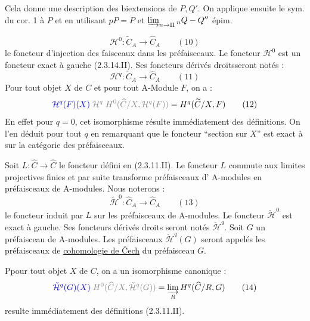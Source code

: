 Cela donne une description des biextensions de $P,Q'$. On applique ensuite le sym. du cor. 1 à $P$ et
en utilisant $pP=P$  et $\varinjlim_{n\to\Pi}{}_nQ\mathbin{-}Q''$ épim.

\[
\mathcal H^0:\widetilde C_A\longrightarrow\widehat C_A \qquad(10)
\]
le foncteur d'injection des faisceaux dans les préfaisceaux.
Le foncteur $\mathcal H^0$ est un foncteur exact à gauche (2.3.14.II).
Ses foncteurs dérivés droitsseront notés :
\[
\mathcal H^q:\widetilde C_A\longrightarrow\widehat C_A \qquad(11)
\]
Pour tout objet $X$ de $C$  et pour tout A-Module $F$, on a :
\[
\inserted{\mathcal H^q(F)(X)}\;\deleted{\unsure{\mathcal H^q}}\;
\deleted{H^0(\widehat C/X,\mathcal H^q(F))}=H^q(\widetilde C/X,F)\qquad(12)
\]
En effet pour $q=0$, cet isomorphisme résulte immédiatement des définitions. On l'en déduit pour tout $q$ en remarquant que le foncteur ``section sur $X$'' est exact à sur la catégorie des préfaisceaux.

Soit $L:\widehat C\longrightarrow\widehat C$ le foncteur défini en (2.3.11.II).
Le foncteur $L$ commute aux limites projectives finies et par suite transforme \margin{$\unsure{\rho}\quad\unsure{\rho}$} préfaisceaux d' A-modules en préfaisceaux de A-modules. Nous noterons :
\[
\check{\mathcal H}^{0}:\widehat C_A\longrightarrow\widehat C_A \qquad(13)
\]
le foncteur induit par $L$ sur les préfaisceaux de A-modules.
Le foncteur $\check{\mathcal H}^0$ est exact à  gauche. Ses foncteurs dérivés droits seront notés $\check{\mathcal H}^q$.  Soit $G$ un préfaisceau de A-modules. Les préfaisceaux $\check{\mathcal H}^q(G)$ seront appelés les préfaisceaux de \uline{cohomologie de \v{C}ech} du préfaisceau $G$.

Ppour tout objet $X$ de $C$, on a un isomorphisme canonique :
\[
\inserted{\check{\mathcal H}^q(G)(X)}\;\deleted{H^0(\widehat C/X,\check{\mathcal H}^q(G))}
=\varinjlim_R H^q(\widehat C/R,G)\qquad(14)
\]
  resulte immédiatement des définitions (2.3.11.II).

